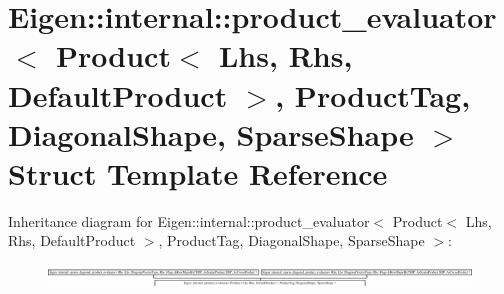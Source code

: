 \hypertarget{struct_eigen_1_1internal_1_1product__evaluator_3_01_product_3_01_lhs_00_01_rhs_00_01_default_pro850b56c5eb8e297547f40d125e705127}{}\section{Eigen\+:\+:internal\+:\+:product\+\_\+evaluator$<$ Product$<$ Lhs, Rhs, Default\+Product $>$, Product\+Tag, Diagonal\+Shape, Sparse\+Shape $>$ Struct Template Reference}
\label{struct_eigen_1_1internal_1_1product__evaluator_3_01_product_3_01_lhs_00_01_rhs_00_01_default_pro850b56c5eb8e297547f40d125e705127}
Inheritance diagram for Eigen\+:\+:internal\+:\+:product\+\_\+evaluator$<$ Product$<$ Lhs, Rhs, Default\+Product $>$, Product\+Tag, Diagonal\+Shape, Sparse\+Shape $>$\+:\begin{figure}[H]
\begin{center}
\leavevmode
\includegraphics[height=0.608696cm]{struct_eigen_1_1internal_1_1product__evaluator_3_01_product_3_01_lhs_00_01_rhs_00_01_default_pro850b56c5eb8e297547f40d125e705127}
\end{center}
\end{figure}
